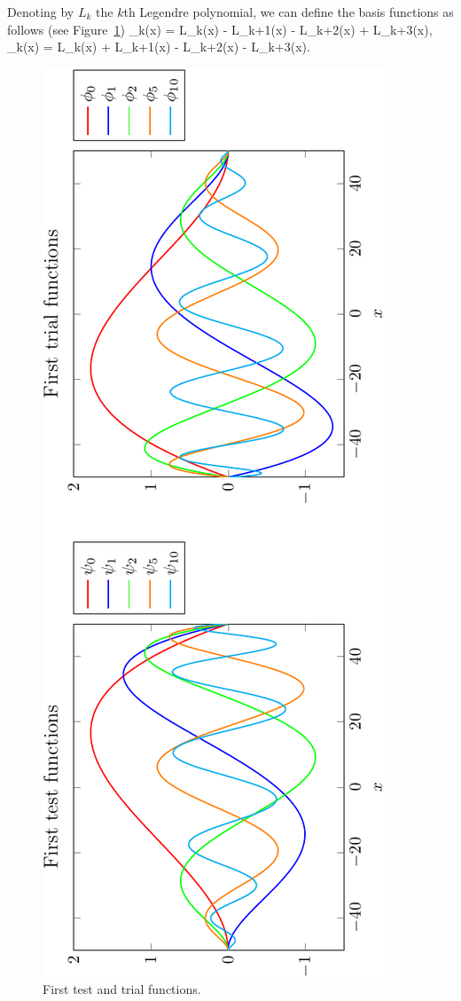 Denoting by $L_k$ the $k$th Legendre polynomial, we can define the basis functions as follows (see Figure~\ref{basisfunctions})
\be
\phi_k(x) = L_k(x) - L_{k+1}(x) - L_{k+2}(x) + L_{k+3}(x),
\ee
\be
\psi_k(x) = L_k(x) + L_{k+1}(x) - L_{k+2}(x) - L_{k+3}(x).
\ee
%
\begin{center}
\begin{figure}[!h]
\includegraphics[scale=0.6,angle=270]{images/plotbasis2.pdf}
\caption{First test and trial functions.}
\label{basisfunctions}
\end{figure}
\end{center}


